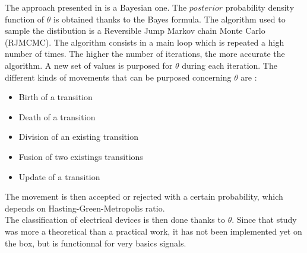 The approach presented in \cite{research2} is a Bayesian one. The $posterior$ probability density function of $\theta$ is obtained thanks to the Bayes formula. The algorithm used to sample the distibution is a Reversible Jump Markov chain Monte Carlo (RJMCMC). The algorithm consists in a main loop which is repeated a high number of times. The higher the number of iterations, the more accurate the algorithm. A new set of values is purposed for $\theta$ during each iteration. The different kinds of movements that can be purposed concerning $\theta$ are :
\begin{itemize}
\item Birth of a transition
\item Death of a transition
\item Division of an existing transition
\item Fusion of two existings transitions
\item Update of a transition
\end{itemize}
The movement is then accepted or rejected with a certain probability, which depends on Hasting-Green-Metropolis ratio.
\\

The classification of electrical devices is then done thanks to $\theta$. Since that study was more a theoretical than a practical work, it has not been implemented yet on the box, but is functionnal for very basics signals.
